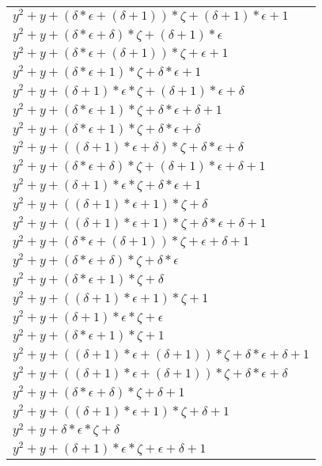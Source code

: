 \documentclass[12pt]{article}
\begin{document}
\begin{center}
\begin{longtable}{|l|}
	$y^2 + y + (\delta*\epsilon + (\delta + 1))*\zeta + (\delta + 1)*\epsilon + 1$ \\
	$y^2 + y + (\delta*\epsilon + \delta)*\zeta + (\delta + 1)*\epsilon$ \\
	$y^2 + y + (\delta*\epsilon + (\delta + 1))*\zeta + \epsilon + 1$ \\
	$y^2 + y + (\delta*\epsilon + 1)*\zeta + \delta*\epsilon + 1$ \\
	$y^2 + y + (\delta + 1)*\epsilon*\zeta + (\delta + 1)*\epsilon + \delta$ \\
	$y^2 + y + (\delta*\epsilon + 1)*\zeta + \delta*\epsilon + \delta + 1$ \\
	$y^2 + y + (\delta*\epsilon + 1)*\zeta + \delta*\epsilon + \delta$ \\
	$y^2 + y + ((\delta + 1)*\epsilon + \delta)*\zeta + \delta*\epsilon + \delta$ \\
	$y^2 + y + (\delta*\epsilon + \delta)*\zeta + (\delta + 1)*\epsilon + \delta + 1$ \\
	$y^2 + y + (\delta + 1)*\epsilon*\zeta + \delta*\epsilon + 1$ \\
	$y^2 + y + ((\delta + 1)*\epsilon + 1)*\zeta + \delta$ \\
	$y^2 + y + ((\delta + 1)*\epsilon + 1)*\zeta + \delta*\epsilon + \delta + 1$ \\
	$y^2 + y + (\delta*\epsilon + (\delta + 1))*\zeta + \epsilon + \delta + 1$ \\
	$y^2 + y + (\delta*\epsilon + \delta)*\zeta + \delta*\epsilon$ \\
	$y^2 + y + (\delta*\epsilon + 1)*\zeta + \delta$ \\
	$y^2 + y + ((\delta + 1)*\epsilon + 1)*\zeta + 1$ \\
	$y^2 + y + (\delta + 1)*\epsilon*\zeta + \epsilon$ \\
	$y^2 + y + (\delta*\epsilon + 1)*\zeta + 1$ \\
	$y^2 + y + ((\delta + 1)*\epsilon + (\delta + 1))*\zeta + \delta*\epsilon + \delta + 1$ \\
	$y^2 + y + ((\delta + 1)*\epsilon + (\delta + 1))*\zeta + \delta*\epsilon + \delta$ \\
	$y^2 + y + (\delta*\epsilon + \delta)*\zeta + \delta + 1$ \\
	$y^2 + y + ((\delta + 1)*\epsilon + 1)*\zeta + \delta + 1$ \\
	$y^2 + y + \delta*\epsilon*\zeta + \delta$ \\
	$y^2 + y + (\delta + 1)*\epsilon*\zeta + \epsilon + \delta + 1$ \\

\end{longtable}
\end{center}
\end{document}
